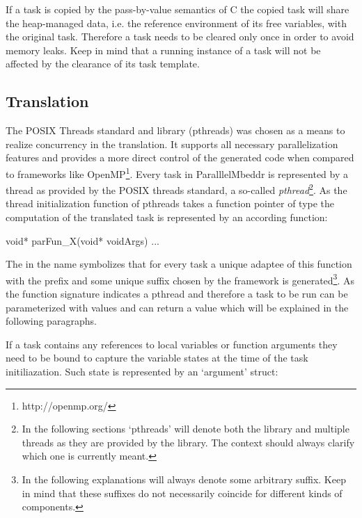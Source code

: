 If a task is copied by the pass-by-value semantics of C the copied task will share the heap-managed data, i.e. the reference environment of its free variables, with the original task. Therefore a task needs to be cleared only once in order to avoid memory leaks. Keep in mind that a running instance of a task will not be affected by the clearance of its task template. 

\subsection{Translation}
\label{tasksTranslation}
The POSIX Threads standard and library (pthreads) was chosen as a means to realize concurrency in the translation. It supports all necessary parallelization features and provides a more direct control of the generated code when compared to frameworks like OpenMP\footnote{http://openmp.org/}. Every task in ParalllelMbeddr is represented by a thread as provided by the POSIX threads standard, a so-called \textit{pthread}\footnote{In the following sections `pthreads' will denote both the library and multiple threads as they are provided by the library. The context should always clarify which one is currently meant.}. As the thread initialization function of pthreads takes a function pointer of type  the computation of the translated task is represented by an according function:
\begin{ccode}
void* parFun_X(void* voidArgs) {...}
\end{ccode}

The  in the name symbolizes that for every task a unique adaptee of this function with the prefix  and some unique suffix chosen by the framework is generated\footnote{In the following explanations  will always denote some arbitrary suffix. Keep in mind that these suffixes do not necessarily coincide for different kinds of components.}. As the function signature indicates a pthread and therefore a task to be run can be parameterized with values and can return a value which will be explained in the following paragraphs.

If a task contains any references to local variables or function arguments they need to be bound to capture the variable states at the time of the task initiliazation. Such state is represented by an `argument' struct:

